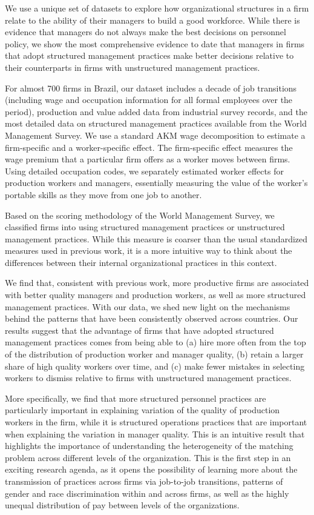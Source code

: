 
We use a unique set of datasets to explore how organizational structures in a firm relate to the ability of their managers to build a good workforce. While there is evidence that managers do not always make the best decisions on personnel policy, we show the most comprehensive evidence to date that managers in firms that adopt structured management practices make better decisions relative to their counterparts in firms with unstructured management practices. 

For almost 700 firms in Brazil, our dataset includes a decade of job transitions (including wage and occupation information for all formal employees over the period), production and value added data from industrial survey records, and the most detailed data on structured management practices available from the World Management Survey. We use a standard AKM wage decomposition to estimate a firm-specific and a worker-specific effect. The firm-specific effect measures the wage premium that a particular firm offers as a worker moves between firms. Using detailed occupation codes, we separately estimated worker effects for production workers and managers, essentially measuring the value of the worker's portable skills as they move from one job to another.

Based on the scoring methodology of the World Management Survey, we classified firms into using structured management practices or unstructured management practices. While this measure is coarser than the usual standardized measures used in previous work, it is a more intuitive way to think about the differences between their internal organizational practices in this context.   

We find that, consistent with previous work, more productive firms are associated with better quality managers and production workers, as well as more structured management practices. With our data, we shed new light on the mechanisms behind the patterns that have been consistently observed across countries. Our results suggest that the advantage of firms that have adopted structured management practices comes from being able to (a) hire more often from the top of the distribution of production worker and manager quality, (b) retain a larger share of high quality workers over time, and (c) make fewer mistakes in selecting workers to dismiss relative to firms with unstructured management practices.

More specifically, we find that more structured personnel practices are particularly important in explaining variation of the quality of production workers in the firm, while it is structured operations practices that are important when explaining the variation in manager quality. This is an intuitive result that highlights the importance of understanding the heterogeneity of the matching problem across different levels of the organization. This is the first step in an exciting research agenda, as it opens the possibility of learning more about the transmission of practices across firms via job-to-job transitions, patterns of gender and race discrimination within and across firms, as well as the highly unequal distribution of pay between levels of the organizations. 

